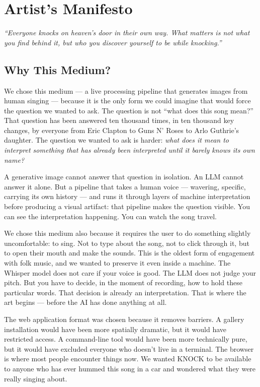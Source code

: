 \documentclass[12pt, a4paper]{article}
\begin{document}
\section{Artist's Manifesto}

\begin{quotebox}
    \centering\itshape\color{rust}
    ``Everyone knocks on heaven's door in their own way. What matters is not what
    you find behind it, but who you discover yourself to be while knocking.''
\end{quotebox}

\subsection{Why This Medium?}

We chose this medium --- a live processing pipeline that generates images from human
singing --- because it is the only form we could imagine that would force the question
we wanted to ask. The question is not ``what does this song mean?'' That question
has been answered ten thousand times, in ten thousand key changes, by everyone from
Eric Clapton to Guns N' Roses to Arlo Guthrie's daughter. The question we wanted to
ask is harder: \textit{what does it mean to interpret something that has already been
interpreted until it barely knows its own name?}

A generative image cannot answer that question in isolation. An LLM cannot answer it
alone. But a pipeline that takes a human voice --- wavering, specific, carrying its
own history --- and runs it through layers of machine interpretation before producing
a visual artifact: that pipeline makes the question visible. You can see the
interpretation happening. You can watch the song travel.

We chose this medium also because it requires the user to do something slightly
uncomfortable: to sing. Not to type about the song, not to click through it, but to
open their mouth and make the sounds. This is the oldest form of engagement with folk
music, and we wanted to preserve it even inside a machine. The Whisper model does not
care if your voice is good. The LLM does not judge your pitch. But you have to
decide, in the moment of recording, how to hold these particular words. That decision
is already an interpretation. That is where the art begins --- before the AI has done
anything at all.

The web application format was chosen because it removes barriers. A gallery
installation would have been more spatially dramatic, but it would have restricted
access. A command-line tool would have been more technically pure, but it would have
excluded everyone who doesn't live in a terminal. The browser is where most people
encounter things now. We wanted KNOCK to be available to anyone who has ever hummed
this song in a car and wondered what they were really singing about.
\end{document}
